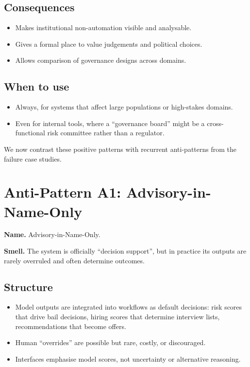 \subsection*{Consequences}

\begin{itemize}
  \item Makes institutional non-automation visible and analysable.
  \item Gives a formal place to value judgements and political choices.
  \item Allows comparison of governance designs across domains.
\end{itemize}

\subsection*{When to use}

\begin{itemize}
  \item Always, for systems that affect large populations or high-stakes
        domains.
  \item Even for internal tools, where a ``governance board'' might be
        a cross-functional risk committee rather than a regulator.
\end{itemize}

\bigskip

We now contrast these positive patterns with recurrent anti-patterns from
the failure case studies.

\section{Anti-Pattern A1: Advisory-in-Name-Only}
\label{antipattern:a1}

\textbf{Name.} Advisory-in-Name-Only.

\textbf{Smell.} The system is officially ``decision support'', but in
practice its outputs are rarely overruled and often determine outcomes.

\subsection*{Structure}

\begin{itemize}
  \item Model outputs are integrated into workflows as default
        decisions:
        risk scores that drive bail decisions, hiring scores that
        determine interview lists, recommendations that become offers.
  \item Human ``overrides'' are possible but rare, costly, or
        discouraged.
  \item Interfaces emphasise model scores, not uncertainty or
        alternative reasoning.
\end{itemize}

